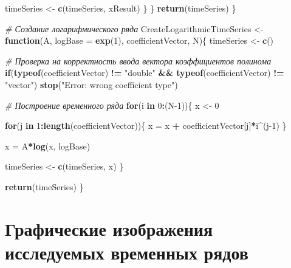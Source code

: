 \documentclass[
]{article}
\newenvironment{Shaded}{\begin{snugshade}}{\end{snugshade}}
\newcommand{\AttributeTok}[1]{\textcolor[rgb]{0.13,0.29,0.53}{#1}}
\newcommand{\CommentTok}[1]{\textcolor[rgb]{0.56,0.35,0.01}{\textit{#1}}}
\newcommand{\ControlFlowTok}[1]{\textcolor[rgb]{0.13,0.29,0.53}{\textbf{#1}}}
\newcommand{\DecValTok}[1]{\textcolor[rgb]{0.00,0.00,0.81}{#1}}
\newcommand{\FunctionTok}[1]{\textcolor[rgb]{0.13,0.29,0.53}{\textbf{#1}}}
\newcommand{\NormalTok}[1]{#1}
\newcommand{\OtherTok}[1]{\textcolor[rgb]{0.56,0.35,0.01}{#1}}
\newcommand{\SpecialCharTok}[1]{\textcolor[rgb]{0.81,0.36,0.00}{\textbf{#1}}}
\newcommand{\StringTok}[1]{\textcolor[rgb]{0.31,0.60,0.02}{#1}}
\begin{document}
\begin{Shaded}
\begin{Highlighting}[]
\NormalTok{      timeSeries }\OtherTok{\textless{}{-}} \FunctionTok{c}\NormalTok{(timeSeries, xResult)}
\NormalTok{    \}}
\NormalTok{  \}}
  \FunctionTok{return}\NormalTok{(timeSeries)}
\NormalTok{\}}



\CommentTok{\# Создание логарифмического ряда}
\NormalTok{CreateLogarithmicTimeSeries }\OtherTok{\textless{}{-}} \ControlFlowTok{function}\NormalTok{(A, }\AttributeTok{logBase =} \FunctionTok{exp}\NormalTok{(}\DecValTok{1}\NormalTok{), coefficientVector, N)\{}
\NormalTok{  timeSeries }\OtherTok{\textless{}{-}} \FunctionTok{c}\NormalTok{()}
  
  
  \CommentTok{\# Проверка на корректность ввода вектора коэффициентов полинома}
  \ControlFlowTok{if}\NormalTok{(}\FunctionTok{typeof}\NormalTok{(coefficientVector) }\SpecialCharTok{!=} \StringTok{"double"} \SpecialCharTok{\&\&} \FunctionTok{typeof}\NormalTok{(coefficientVector) }\SpecialCharTok{!=} \StringTok{"vector"}\NormalTok{) }\FunctionTok{stop}\NormalTok{(}\StringTok{"Error: wrong coefficient type"}\NormalTok{)}
  
  \CommentTok{\# Построение временного ряда}
  \ControlFlowTok{for}\NormalTok{(i }\ControlFlowTok{in} \DecValTok{0}\SpecialCharTok{:}\NormalTok{(N}\DecValTok{{-}1}\NormalTok{))\{}
\NormalTok{    x }\OtherTok{\textless{}{-}} \DecValTok{0}
    
    \ControlFlowTok{for}\NormalTok{(j }\ControlFlowTok{in} \DecValTok{1}\SpecialCharTok{:}\FunctionTok{length}\NormalTok{(coefficientVector))\{}
\NormalTok{      x }\OtherTok{=}\NormalTok{ x }\SpecialCharTok{+}\NormalTok{ coefficientVector[j]}\SpecialCharTok{*}\NormalTok{i}\SpecialCharTok{\^{}}\NormalTok{(j}\DecValTok{{-}1}\NormalTok{)}
\NormalTok{    \}}
    
\NormalTok{    x }\OtherTok{=}\NormalTok{ A}\SpecialCharTok{*}\FunctionTok{log}\NormalTok{(x, logBase)}
    
\NormalTok{    timeSeries }\OtherTok{\textless{}{-}} \FunctionTok{c}\NormalTok{(timeSeries, x)}
\NormalTok{  \}}
  
  \FunctionTok{return}\NormalTok{(timeSeries)}
\NormalTok{\}}
\end{Highlighting}
\end{Shaded}

\section{Графические изображения исследуемых временных
рядов}\label{ux433ux440ux430ux444ux438ux447ux435ux441ux43aux438ux435-ux438ux437ux43eux431ux440ux430ux436ux435ux43dux438ux44f-ux438ux441ux441ux43bux435ux434ux443ux435ux43cux44bux445-ux432ux440ux435ux43cux435ux43dux43dux44bux445-ux440ux44fux434ux43eux432}
\end{document}
